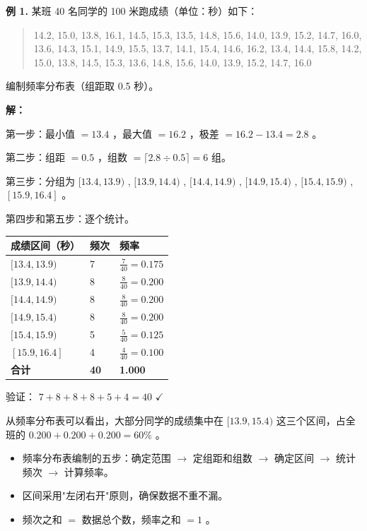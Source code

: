 \begin{workedexamples}


\textbf{例 1.} 某班 40 名同学的 100 米跑成绩（单位：秒）如下：

\end{workedexamples}

\begin{quote}
14.2, 15.0, 13.8, 16.1, 14.5, 15.3, 13.5, 14.8, 15.6, 14.0,
13.9, 15.2, 14.7, 16.0, 13.6, 14.3, 15.1, 14.9, 15.5, 13.7,
14.1, 15.4, 14.6, 16.2, 13.4, 14.4, 15.8, 14.2, 15.0, 13.8,
14.5, 15.3, 13.6, 14.8, 15.6, 14.0, 13.9, 15.2, 14.7, 16.0
\end{quote}


编制频率分布表（组距取 0.5 秒）。

\textbf{解：}

第一步：最小值 $= 13.4$ ，最大值 $= 16.2$ ，极差 $= 16.2 - 13.4 = 2.8$ 。

第二步：组距 $= 0.5$ ，组数 $= \lceil 2.8 \div 0.5 \rceil = 6$ 组。

第三步：分组为 $[13.4, 13.9)$ , $[13.9, 14.4)$ , $[14.4, 14.9)$ , $[14.9, 15.4)$ , $[15.4, 15.9)$ , $[15.9, 16.4]$ 。

第四步和第五步：逐个统计。

\begin{center}
\begin{tabular}{lll}
\toprule
成绩区间（秒） & 频次 & 频率 \\
\midrule
$[13.4, 13.9)$ & 7 & $\frac{7}{40} = 0.175$ \\
$[13.9, 14.4)$ & 8 & $\frac{8}{40} = 0.200$ \\
$[14.4, 14.9)$ & 8 & $\frac{8}{40} = 0.200$ \\
$[14.9, 15.4)$ & 8 & $\frac{8}{40} = 0.200$ \\
$[15.4, 15.9)$ & 5 & $\frac{5}{40} = 0.125$ \\
$[15.9, 16.4]$ & 4 & $\frac{4}{40} = 0.100$ \\
\textbf{合计} & \textbf{40} & \textbf{1.000} \\
\bottomrule
\end{tabular}
\end{center}


验证： $7 + 8 + 8 + 8 + 5 + 4 = 40$ $\checkmark$

从频率分布表可以看出，大部分同学的成绩集中在 $[13.9, 15.4)$ 这三个区间，占全班的 $0.200 + 0.200 + 0.200 = 60\%$ 。

\begin{keytakeaway}


\begin{itemize}
  \item 频率分布表编制的五步：确定范围 $\to$ 定组距和组数 $\to$ 确定区间 $\to$ 统计频次 $\to$ 计算频率。
  \item 区间采用"左闭右开"原则，确保数据不重不漏。
  \item 频次之和 $=$ 数据总个数，频率之和 $= 1$ 。
\end{itemize}


\end{keytakeaway}



